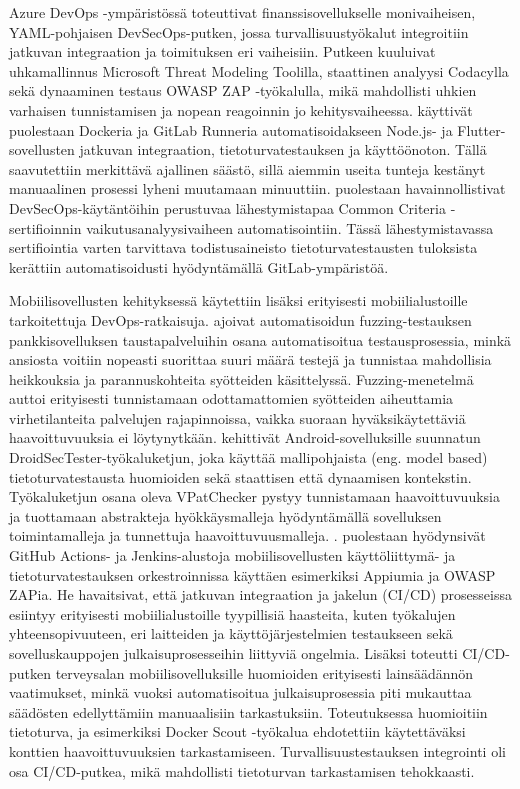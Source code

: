 \documentclass[bscthesis,finnish,oneside,biblatex]{uefcsthesis}
\begin{document}
Azure DevOps -ympäristössä \cite{kushwaha2024_cct} toteuttivat finanssisovellukselle monivaiheisen, YAML-pohjaisen DevSecOps-putken, jossa turvallisuustyökalut integroitiin jatkuvan integraation ja toimituksen eri vaiheisiin. Putkeen kuuluivat uhkamallinnus Microsoft Threat Modeling Toolilla, staattinen analyysi Codacylla sekä dynaaminen testaus OWASP ZAP -työkalulla, mikä mahdollisti uhkien varhaisen tunnistamisen ja nopean reagoinnin jo kehitysvaiheessa. \cite{putra2022_devsecops} käyttivät puolestaan Dockeria ja GitLab Runneria automatisoidakseen Node.js- ja Flutter-sovellusten jatkuvan integraation, tietoturvatestauksen ja käyttöönoton. Tällä saavutettiin merkittävä ajallinen säästö, sillä aiemmin useita tunteja kestänyt manuaalinen prosessi lyheni muutamaan minuuttiin. \cite{dupont2021_incremental} puolestaan havainnollistivat DevSecOps-käytäntöihin perustuvaa lähestymistapaa Common Criteria -sertifioinnin vaikutusanalyysivaiheen automatisointiin. Tässä lähestymistavassa sertifiointia varten tarvittava todistusaineisto tietoturvatestausten tuloksista kerättiin automatisoidusti hyödyntämällä GitLab-ympäristöä.

Mobiilisovellusten kehityksessä käytettiin lisäksi erityisesti mobiilialustoille tarkoitettuja DevOps-ratkaisuja. \cite{schneider_2020_fuzzing} ajoivat automatisoidun fuzzing-testauksen pankkisovelluksen taustapalveluihin osana automatisoitua testausprosessia, minkä ansiosta voitiin nopeasti suorittaa suuri määrä testejä ja tunnistaa mahdollisia heikkouksia ja parannuskohteita syötteiden käsittelyssä. Fuzzing-menetelmä auttoi erityisesti tunnistamaan odottamattomien syötteiden aiheuttamia virhetilanteita palvelujen rajapinnoissa, vaikka suoraan hyväksikäytettäviä haavoittuvuuksia ei löytynytkään. \cite{baheux2023_droidsectester} kehittivät Android-sovelluksille suunnatun DroidSecTester-työkaluketjun, joka käyttää mallipohjaista (eng. model based) tietoturvatestausta huomioiden sekä staattisen että dynaamisen kontekstin. Työkaluketjun osana oleva VPatChecker pystyy tunnistamaan haavoittuvuuksia ja tuottamaan abstrakteja hyökkäysmalleja hyödyntämällä sovelluksen toimintamalleja ja tunnettuja haavoittuvuusmalleja. \cite{ozdenizci2024mobilizing}. puolestaan hyödynsivät GitHub Actions- ja Jenkins-alustoja mobiilisovellusten käyttöliittymä- ja tietoturvatestauksen orkestroinnissa käyttäen esimerkiksi Appiumia ja OWASP ZAPia. He havaitsivat, että jatkuvan integraation ja jakelun (CI/CD) prosesseissa esiintyy erityisesti mobiilialustoille tyypillisiä haasteita, kuten työkalujen yhteensopivuuteen, eri laitteiden ja käyttöjärjestelmien testaukseen sekä sovelluskauppojen julkaisuprosesseihin liittyviä ongelmia. Lisäksi \cite{byman2024continuous} toteutti CI/CD-putken terveysalan mobiilisovelluksille huomioiden erityisesti lainsäädännön vaatimukset, minkä vuoksi automatisoitua julkaisuprosessia piti mukauttaa säädösten edellyttämiin manuaalisiin tarkastuksiin. Toteutuksessa huomioitiin tietoturva, ja esimerkiksi Docker Scout -työkalua ehdotettiin käytettäväksi konttien haavoittuvuuksien tarkastamiseen. Turvallisuustestauksen integrointi oli osa CI/CD-putkea, mikä mahdollisti tietoturvan tarkastamisen tehokkaasti.
\end{document}
